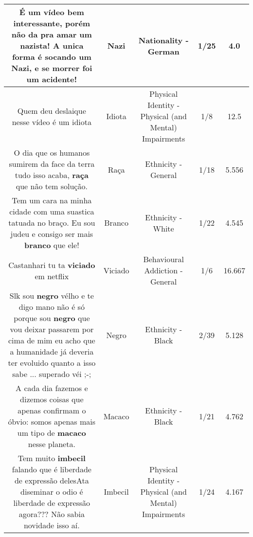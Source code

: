 \documentclass[11pt]{article}
\newlength\mylength
\begin{document}
\begin{center}
\begin{longtable}{|C{.65\mylength}|C{.30\mylength}|C{.12\mylength}|C{.12\mylength}|C{.12\mylength}|}
  \small É um vídeo bem interessante, porém não da pra amar um nazista!  A unica forma é socando um \textbf{Nazi}, e se morrer foi um acidente!\normalsize   & Nazi & Nationality - German & 1/25 & 4.0 \\  \hline
  \small Quem deu deslaique nesse vídeo é um idiota\normalsize   & Idiota & Physical Identity - Physical (and Mental) Impairments & 1/8 & 12.5 \\  \hline
  \small O dia que os humanos sumirem da face da terra tudo isso acaba, \textbf{raça} que não tem solução.\normalsize   & Raça & Ethnicity - General & 1/18 & 5.556 \\  \hline
  \small Tem um cara na minha cidade com uma suastica tatuada no braço. Eu sou judeu e consigo ser mais \textbf{branco} que ele!\normalsize   & Branco & Ethnicity - White & 1/22 & 4.545 \\  \hline
  \small Castanhari tu ta \textbf{viciado} em netflix\normalsize   & Viciado & Behavioural Addiction - General & 1/6 & 16.667 \\  \hline
  \small Slk sou \textbf{negro} vélho e te digo mano não é só porque sou \textbf{negro} que vou deixar passarem por cima de mim eu acho que a humanidade já deveria ter evoluido quanto a isso sabe ... superado véi ;-;\normalsize   & Negro & Ethnicity - Black & 2/39 & 5.128 \\  \hline
  \small A cada dia fazemos e dizemos coisas que apenas confirmam o óbvio: somos apenas mais um tipo de \textbf{macaco} nesse planeta.\normalsize   & Macaco & Ethnicity - Black & 1/21 & 4.762 \\  \hline
  \small Tem muito \textbf{imbecil} falando que é  liberdade  de expressão  delesAta diseminar o odio é  liberdade de expressão  agora??? Não  sabia novidade isso aí.\normalsize   & Imbecil & Physical Identity - Physical (and Mental) Impairments & 1/24 & 4.167 \\  \hline

\end{longtable}
\end{center}
\end{document}
